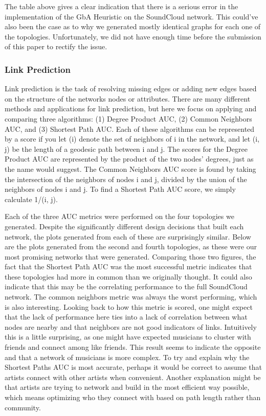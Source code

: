 \documentclass{article}
\begin{document}
The table above gives a clear indication that there is a serious error in the implementation of the GbA Heuristic on the SoundCloud network.  This could've also been the case as to why we generated mostly identical graphs for each one of the topologies.  Unfortunately, we did not have enough time before the submission of this paper to rectify the issue.

\subsubsection{Link Prediction}
Link prediction is the task of resolving missing edges or adding new edges based on the structure of the networks nodes or attributes. There are many different methods and applications for link prediction, but here we focus on applying and comparing three algorithms: (1) Degree Product AUC, (2) Common Neighbors AUC, and (3) Shortest Path AUC. Each of these algorithms can be represented by a score if you let \Gamma(i) denote the set of neighbors of i in the network, and let \sigma(i, j) be the length of a geodesic path between i and j. The scores for the Degree Product AUC are represented by the product of the two nodes' degrees, just as the name would suggest. The Common Neighbors AUC score is found by taking the intersection of the neighbors of nodes i and j, divided by the union of the neighbors of nodes i and j. To find a Shortest Path AUC score, we simply calculate 1/\sigma(i, j). 

Each of the three AUC metrics were performed on the four topologies we generated. Despite the significantly different design decisions that built each network, the plots generated from each of these are surprisingly similar. Below are the plots generated from the second and fourth topologies, as these were our most promising networks that were generated. Comparing those two figures, the fact that the Shortest Path AUC was the most successful metric indicates that these topologies had more in common than we originally thought. It could also indicate that this may be the correlating performance to the full SoundCloud network. The common neighbors metric was always the worst performing, which is also interesting. Looking back to how this metric is scored, one might expect that the lack of performance here ties into a lack of correlation between what nodes are nearby and that neighbors are not good indicators of links. Intuitively this is a little surprising, as one might have expected musicians to cluster with friends and connect among like friends. This result seems to indicate the opposite and that a network of musicians is more complex. To try and explain why the Shortest Paths AUC is most accurate, perhaps it would be correct to assume that artists connect with other artists when convenient. Another explanation might be that artists are trying to network and build in the most efficient way possible, which means optimizing who they connect with based on path length rather than community.  
\end{document}
